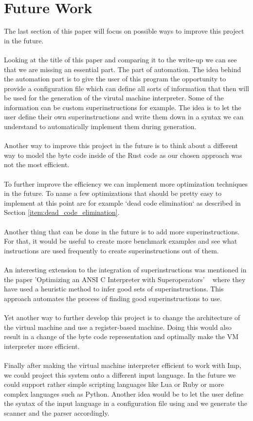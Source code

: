 \documentclass{article}
\begin{document}
\section{Future Work}
\label{sec:future}
The last section of this paper will focus on possible ways to improve this
project in the future.
\\\\
Looking at the title of this paper and comparing it to the write-up we can see
that we are missing an essential part. The part of automation.
The idea behind the automation part is to give the user of this program
the opportunity to provide a configuration file which can define all 
sorts of information that then will be used for the generation of the
virutal machine interpreter.
Some of the information can be custom superinstructions for example. The idea
is to let the user define their own superinstructions and write them down in a
syntax we can understand to automatically implement them during generation.
\\\\
Another way to improve this project in the future is to think about a different
way to model the byte code inside of the Rust code as our chosen approach was
not the most efficient.
\\\\
To further improve the efficiency we can implement more optimization techniques
in the future. To name a few optimizations that should be pretty easy to
implement at this point are for example `dead code elimination` as described in
Section \ref{item:dead_code_elimination}.
\\\\
Another thing that can be done in the future is to add more superinstructions.
For that, it would be useful to create more benchmark examples and see what
instructions are used frequently to create superinstructions out of them.
\\\\
An interesting extension to the integration of superinstructions was mentioned
in the paper 'Optimizing an ANSI C Interpreter with Superoperators'
~\cite{superoperators} where they have used a heuristic method to infer good
sets of superinstructions. This approach automates the process of finding good
superinstructions to use.
\\\\
Yet another way to further develop this project is to change the architecture of the
virtual machine and use a register-based machine. Doing this would also result
in a change of the byte code representation and optimally make the VM interpreter
more efficient.
\\\\
Finally after making the virtual machine interpreter efficient to work with Imp,
we could project this system onto a different input language. In the future we
could support rather simple scripting languages like Lua or Ruby or more complex
languages such as Python. Another idea would be to let the user define the
syntax of the input language in a configuration file using and we generate
the scanner and the parser accordingly.

\clearpage


\end{document}

